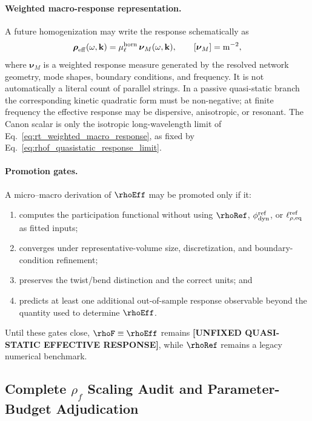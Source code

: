 \paragraph{Weighted macro-response representation.}
A future homogenization may write the response schematically as
\begin{align}
    \boldsymbol\rho_{\rm eff}(\omega,\mathbf k)
    =
    \mu_{\ell}^{\rm horn}\,
    \boldsymbol\nu_M(\omega,\mathbf k),
    \qquad
    [\boldsymbol\nu_M]=\mathrm{m^{-2}},
    \label{eq:rt_weighted_macro_response}
\end{align}
where $\boldsymbol\nu_M$ is a weighted response measure generated by the
resolved network geometry, mode shapes, boundary conditions, and frequency.
It is not automatically a literal count of parallel strings.  In a passive
quasi-static branch the corresponding kinetic quadratic form must be
non-negative; at finite frequency the effective response may be dispersive,
anisotropic, or resonant.  The Canon scalar is only the isotropic
long-wavelength limit of Eq.~\eqref{eq:rt_weighted_macro_response}, as fixed
by Eq.~\eqref{eq:rhof_quasistatic_response_limit}.

\paragraph{Promotion gates.}
A micro--macro derivation of $\rhoEff$ may be promoted only if it:
\begin{enumerate}
    \item computes the participation functional without using $\rhoRef$,
          $\phi_{\rm dyn}^{\rm ref}$, or $\ell_{\rho,\rm eq}^{\rm ref}$ as fitted inputs;
    \item converges under representative-volume size, discretization, and
          boundary-condition refinement;
    \item preserves the twist/bend distinction and the correct units; and
    \item predicts at least one additional out-of-sample response observable
          beyond the quantity used to determine \(\rhoEff\).
\end{enumerate}
Until these gates close, $\rhoF\equiv\rhoEff$ remains
\textbf{[UNFIXED QUASI-STATIC EFFECTIVE RESPONSE]}, while
$\rhoRef$ remains a legacy numerical benchmark.


\subsection{Complete \texorpdfstring{$\rho_f$}{rho-f} Scaling Audit and Parameter-Budget Adjudication}
\label{subsec:rt_rhof_scaling_audit_v0832}

